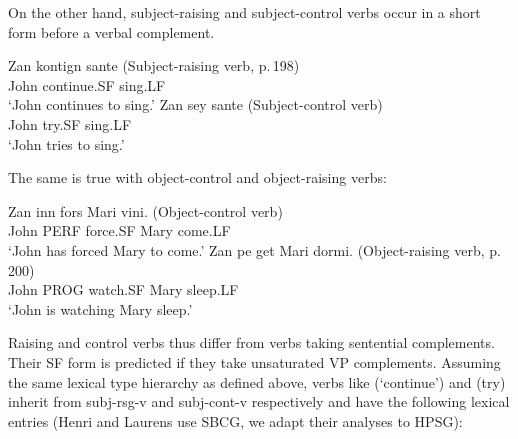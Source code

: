 \documentclass[output=paper]{langsci/langscibook}
\begin{document}
On the other hand, subject-raising and subject-control verbs occur in a short form before a verbal complement.

\begin{exe}
\ex \begin{xlist}
\ex \gll Zan kontign sante (Subject-raising verb, p.\,198)\\
John continue.SF sing.LF\\
\glt `John continues to sing.’
\ex \gll Zan sey sante (Subject-control verb)\\
John try.SF sing.LF\\
\glt `John tries to sing.'
\end{xlist}
\end{exe}

The same is true with object-control and object-raising verbs:
\begin{exe}
\ex \begin{xlist}
\ex \gll Zan inn fors Mari vini. (Object-control verb)\\
John PERF force.SF Mary come.LF\\
\glt ‘John has forced Mary to come.’
\ex \gll Zan pe get Mari dormi. (Object-raising verb, p.\,200) \\
John PROG watch.SF Mary sleep.LF\\
\glt ‘John is watching Mary sleep.’
\end{xlist}
\end{exe}


Raising  and control verbs thus differ from verbs taking sentential complements. Their SF form is predicted if they take unsaturated VP complements. Assuming the same lexical type hierarchy as defined above, verbs like  (`continue') and  (try) inherit from subj-rsg-v and subj-cont-v respectively and have the following lexical entries (Henri and Laurens use SBCG, we adapt their analyses to HPSG):
\end{document}
